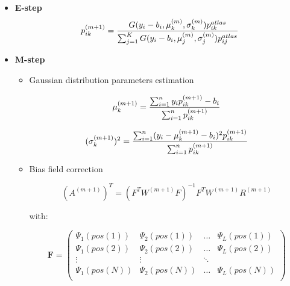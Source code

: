 \begin{itemize}

\item\textbf{E-step}\\
  \begin{equation*}
  p_{ik}^{(m+1)}= \frac{G(y_i-b_i,\mu_k^{(m)},\sigma_k^{(m)})p_{ik}^{atlas}}{\sum_{j=1}^K G(y_i-b_i,\mu_j^{(m)},\sigma_j^{(m)})p_{ij}^{atlas}}\\
  \end{equation*}
  
\item\textbf{M-step}\\
  \begin{itemize}

  \item Gaussian distribution parameters estimation
    
    \begin{equation*}
    \mu_k^{(m+1)} = \frac{\sum_{i=1}^n y_ip_{ik}^{(m+1)}-b_i}{\sum_{i=1}^n p_{ik}^{(m+1)}}\\
    \end{equation*}

    \begin{equation*}
    (\sigma_k^{(m+1)})^2 = \frac{\sum_{i=1}^n (y_i-\mu_k^{(m+1)}-b_i)^2p_{ik}^{(m+1)}}{\sum_{i=1}^n p_{ik}^{(m+1)}}\\
    \end{equation*}

  \item Bias field correction

  \begin{equation}\label{BIASFIELD}  
  (A^{(m+1)})^T = (F^TW^{(m+1)}F)^{-1}F^TW^{(m+1)}R^{(m+1)}  
  \end{equation}

with:

  \begin{equation*}
   \mathbf{F} = \left(
  \begin{array}{clcr}
   \Psi_1(pos(1)) & \Psi_2(pos(1)) & \ldots & \Psi_L(pos(1)) \\
   \Psi_1(pos(2)) & \Psi_2(pos(2)) & \ldots & \Psi_L(pos(2)) \\
   \vdots & \vdots & \ddots \\
   \Psi_1(pos(N)) & \Psi_2(pos(N)) & \ldots & \Psi_L(pos(N)) \\
  \end{array} \right)
  \end{equation*}
  

\end{itemize}
\end{itemize}
